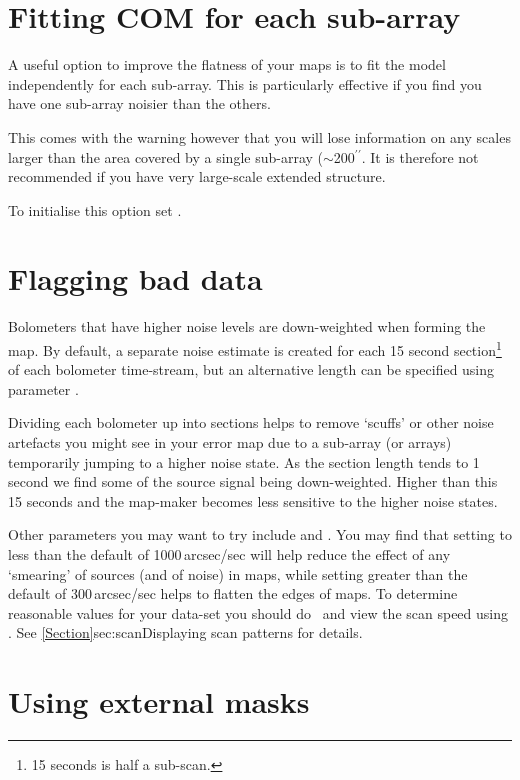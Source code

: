 \section{Fitting COM for each sub-array}
\label{sec:fitcom}

A useful option to improve the flatness of your maps is to fit the
 model independently for each sub-array. This is
particularly effective if you find you have one sub-array noisier than
the others.

This comes with the warning however that you will lose information on
any scales larger than the area covered by a single sub-array
($\sim$200$^{\prime\prime}$. It is therefore not recommended if
you have very large-scale extended structure.

To initialise this option set .


\section{Flagging bad data}
\label{sec:noibox}

Bolometers that have higher noise levels are down-weighted when forming
the map. By default, a separate noise estimate is created for each
15 second section\footnote{15 seconds is half a sub-scan.} of each bolometer
time-stream, but an alternative length can be specified using parameter
.

Dividing each bolometer up into sections helps to remove `scuffs' or other
noise artefacts you might see in your error map due to a sub-array (or
arrays) temporarily jumping to a higher noise state. As the section length
tends to 1 second we find some of the source signal being down-weighted.
Higher than this 15 seconds and the map-maker becomes less sensitive to
the higher noise states.

Other parameters you may want to try include  and
. You may find that setting  to less
than the default of 1000\,arcsec/sec will help reduce the effect of any
`smearing' of sources (and of noise) in maps, while setting
 greater than the default of 300\,arcsec/sec helps to
flatten the edges of maps. To determine reasonable values for your
 data-set you should do \jcmtstate\ and view the scan speed using
\topcat. See \cref{Section}{sec:scan}{Displaying scan patterns} for
details.


\section{Using external masks}
\label{sec:maskbe}

